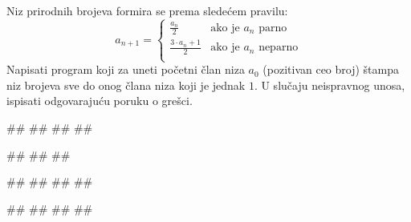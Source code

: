 \begin{Exercise}[label=1.3_32] 
Niz prirodnih brojeva formira se prema sledećem pravilu:
\begin{equation*}
a_{n+1} = \left\{
\begin{array}{cl}
\frac{a_n}{2} & \text{ako je } a_n \text{ parno}\\
\frac{3\cdot a_n + 1}{2} & \text{ako je } a_n \text{ neparno}\\
\end{array} \right.
\end{equation*}
Napisati program koji za uneti početni član niza $a_0$ (pozitivan ceo
broj) štampa niz brojeva sve do onog člana niza koji je jednak $1$. 
U slučaju neispravnog unosa, ispisati odgovarajuću poruku o grešci.

\begin{miditest}
\begin{upotreba}{1}
#\naslovInt#
##
##
##
\end{upotreba}
\end{miditest}
\begin{miditest}
\begin{upotreba}{2}
#\naslovInt#
##
##
\end{upotreba}
\end{miditest}

\begin{miditest}
\begin{upotreba}{3}
#\naslovInt#
##
##
##
\end{upotreba}
\end{miditest}
\begin{miditest}
\begin{upotreba}{4}
#\naslovInt#
##
##
##
\end{upotreba}
\end{miditest}
\end{Exercise}

\ifresenja
\begin{Answer}[ref=PET_32]
\end{Answer}
\fi



